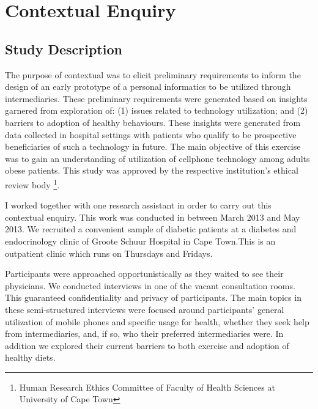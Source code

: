 
\chapter{Contextual Enquiry} %

\label{contextualenqchapter} %


\section{Study Description}
The purpose of contextual was to elicit preliminary requirements to inform the design of an early prototype of a personal informatics to be utilized through intermediaries. These preliminary requirements were generated based on insights garnered from exploration of: (1) issues related  to technology utilization; and (2) barriers to adoption of healthy behaviours. These insights were generated from data collected in hospital settings with patients who qualify to be prospective beneficiaries of such a technology in future. The main objective of this exercise was to gain an understanding of utilization of cellphone technology among adults obese patients. This study was approved by the respective institution's ethical review body \footnote{Human Research Ethics Committee of Faculty of Health Sciences at University of Cape Town}.

I worked together with one research assistant in order to carry out this contextual enquiry. This work was conducted in between March 2013 and May 2013. We recruited a convenient sample of diabetic patients at a diabetes and endocrinology clinic of Groote Schuur Hospital in Cape Town.This is an outpatient clinic which runs on Thursdays and Fridays.

Participants were approached opportunistically as they waited to see their physicians. We conducted interviews in one of the vacant consultation rooms. This guaranteed confidentiality and privacy of participants. The main topics in these semi-structured interviews were focused around participants' general utilization of mobile phones and specific usage for health, whether they seek help from intermediaries, and, if so, who their preferred intermediaries were. In addition we explored their current barriers to both exercise  and adoption of healthy diets.

